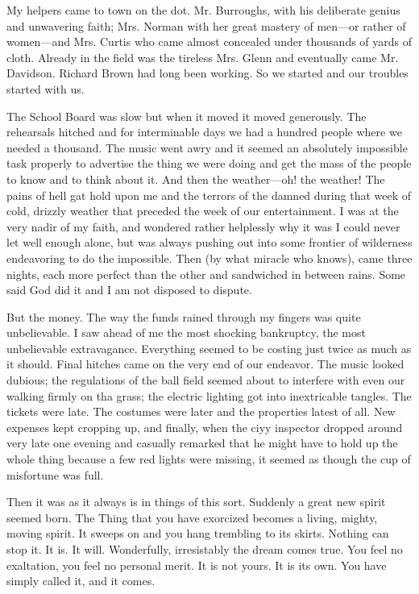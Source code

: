 \documentclass[letterpaper,10pt,english]{jupyterBook}
\begin{document}
\sphinxAtStartPar
My helpers came to town on the dot. Mr. Burroughs, with his deliberate genius and unwavering faith; Mrs. Norman with her great mastery of men—or rather of women—and Mrs. Curtis who came almost concealed under thousands of yards of cloth. Already in the field was the tireless Mrs. Glenn and eventually came Mr. Davidson. Richard Brown had long been working. So we started and our troubles started with us.

\sphinxAtStartPar
The School Board was slow but when it moved it moved generously. The rehearsals hitched and for interminable days we had a hundred people where we needed a thousand. The music went awry and it seemed an absolutely impossible task properly to advertise the thing we were doing and get the mass of the people to know and to think about it. And then the weather—oh! the weather! The pains of hell gat hold upon me and the terrors of the damned during that week of cold, drizzly weather that preceded the week of our entertainment. I was at the very nadir of my faith, and wondered rather helplessly why it was I could never let well enough alone, but was always pushing out into some frontier of wilderness endeavoring to do the impossible. Then (by what miracle who knows), came three nights, each more perfect than the other and sandwiched in between rains. Some said God did it and I am not disposed to dispute.

\sphinxAtStartPar
But the money. The way the funds rained through my fingers was quite unbelievable. I saw ahead of me the most shocking bankruptcy, the most unbelievable extravagance. Everything seemed to be costing just twice as much as it should. Final hitches came on the very end of our endeavor. The music looked dubious; the regulations of the ball field seemed about to interfere with even our walking firmly on tha grass; the electric lighting got into inextricable tangles. The tickets were late. The costumes were later and the properties latest of all. New expenses kept cropping up, and finally, when the ciyy inspector dropped around very late one evening and casually remarked that he might have to hold up the whole thing because a few red lights were missing, it seemed as though the cup of misfortune was full.

\sphinxAtStartPar
Then it was as it always is in things of this sort. Suddenly a great new spirit seemed born. The Thing that you have exorcized becomes a living, mighty, moving spirit. It sweeps on and you hang trembling to its skirts. Nothing can stop it. It is. It will. Wonderfully, irresistably the dream comes true. You feel no exaltation, you feel no personal merit. It is not yours. It is its own. You have simply called it, and it comes.
\end{document}
